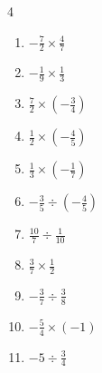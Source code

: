 \begin{multicols}{4}
\begin{enumerate}

  \item $\displaystyle -\frac{7}{2}\times{}\frac{4}{7}$

        \phantom{$\displaystyle =-2$}

  \item $\displaystyle -\frac{1}{9}\times{}\frac{1}{3}$


  \item $\displaystyle \frac{7}{2}\times{}\left(-\frac{3}{4}\right)$


  \item $\displaystyle \frac{1}{2}\times{}\left(-\frac{4}{5}\right)$


  \item $\displaystyle \frac{1}{3}\times{}\left(-\frac{1}{7}\right)$


  \item $\displaystyle -\frac{3}{5}\div{}\left(-\frac{4}{5}\right)$


  \item $\displaystyle \frac{10}{7}\div{}\frac{1}{10}$


  \item $\displaystyle \frac{3}{7}\times{}\frac{1}{2}$


\columnbreak %

  \item $\displaystyle -\frac{3}{7}\div{}\frac{3}{8}$


  \item $\displaystyle -\frac{5}{4}\times{}\left(-1\right)$


  \item $\displaystyle -5\div{}\frac{3}{4}$



\end{enumerate}
\end{multicols}
